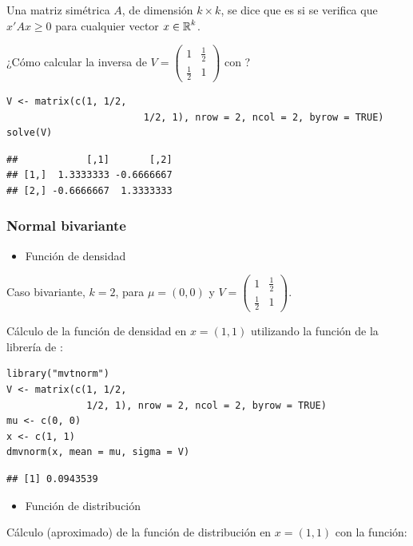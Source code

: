 Una matriz simétrica $A$, de dimensión $k\times k$, se dice que es  si se verifica que $x'Ax\ge0$ para cualquier vector $x\in\operatorname{\mathbb{R}}^k$.

¿Cómo calcular la inversa de $V=\begin{pmatrix}
1 & \tfrac{1}{2}\\
\tfrac{1}{2} & 1
\end{pmatrix}$ con ?

\vspace{0.5cm}

\begin{lstlisting}
V <- matrix(c(1, 1/2,
						1/2, 1), nrow = 2, ncol = 2, byrow = TRUE)
solve(V)
\end{lstlisting}

\begin{verbatim}
##            [,1]       [,2]
## [1,]  1.3333333 -0.6666667
## [2,] -0.6666667  1.3333333
\end{verbatim}

\subsubsection{Normal bivariante}
\begin{itemize}[label=\color{red}\textbullet, leftmargin=*]
	\item \color{lightblue}Función de densidad
\end{itemize}
Caso bivariante, $k=2$, para $\mu=(0,0)$ y $V=\begin{pmatrix}
1 & \tfrac{1}{2}\\
\tfrac{1}{2} & 1
\end{pmatrix}$.

Cálculo de la función de densidad en $x=(1,1)$ utilizando la función  de la librería  de :

\begin{lstlisting}
library("mvtnorm")
V <- matrix(c(1, 1/2,
              1/2, 1), nrow = 2, ncol = 2, byrow = TRUE)
mu <- c(0, 0)
x <- c(1, 1)
dmvnorm(x, mean = mu, sigma = V)
\end{lstlisting}

\begin{verbatim}
## [1] 0.0943539
\end{verbatim}
\begin{itemize}[label=\color{red}\textbullet, leftmargin=*]
	\item \color{lightblue}Función de distribución
\end{itemize}
Cálculo (aproximado) de la función de distribución en $x=(1,1)$ con la función: 

